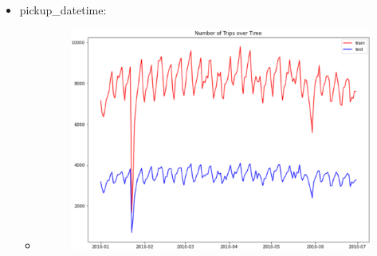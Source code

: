 \documentclass[
 size=14pt,
 paper=smartboard,  %
 mode=present, 		%
 display=slides, 	%
 style=tuliplab,  	%
 pauseslide,
 fleqn,leqno]{powerdot}
\begin{document}
\begin{slide}[toc=,bm=]{}
  \begin{itemize}
    \item pickup_datetime:
      \begin{itemize}
        \item \begin{figure}\includegraphics[scale=0.4]{figures/eight.eps}\end{figure}
      \end{itemize}
  \end{itemize}
\end{slide}
\end{document}
